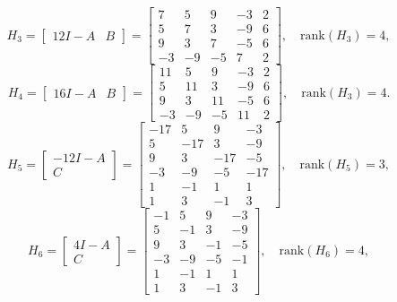 \begin{equation*}
    H_3 = \begin{bmatrix}
        12 I - A & B
    \end{bmatrix} =
    \begin{bmatrix}
        7 & 5 & 9 & -3 & 2 \\
        5 & 7 & 3 & -9 & 6 \\
        9 & 3 & 7 & -5 & 6 \\
        -3 & -9 & -5 & 7 & 2
    \end{bmatrix},
    \quad\text{rank}(H_3) = 4,
\end{equation*}
\begin{equation*}
    H_4 = \begin{bmatrix}
        16 I - A & B
    \end{bmatrix} =
    \begin{bmatrix}
        11 & 5 & 9 & -3 & 2 \\
         5 & 11 & 3 & -9 & 6 \\
         9 & 3 & 11 & -5 & 6 \\
        -3 & -9 & -5 & 11 & 2
    \end{bmatrix},
    \quad\text{rank}(H_3) = 4.
\end{equation*}
\begin{equation*}
    H_5 = \begin{bmatrix}
        -12 I - A \\ C
        \end{bmatrix} =
        \begin{bmatrix}
          -17 & 5  & 9  & -3 \\
           5  & -17 & 3  & -9 \\
           9  & 3  & -17 & -5 \\
          -3  & -9 & -5  & -17 \\
           1  & -1 & 1  & 1  \\
           1  & 3  & -1 & 3
        \end{bmatrix},
    \quad\text{rank}(H_5) = 3,
\end{equation*}
\begin{equation*}
    H_6 = \begin{bmatrix}
        4 I - A \\ C
    \end{bmatrix} =
    \begin{bmatrix}
        -1 & 5 & 9 & -3 \\
         5 & -1 & 3 & -9 \\
         9 & 3 & -1 & -5 \\
        -3 & -9 & -5 & -1 \\
         1 & -1 & 1 & 1 \\
         1 & 3 & -1 & 3
        \end{bmatrix},
        \quad\text{rank}(H_6) = 4,
    \end{equation*}
